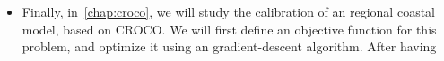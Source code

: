 \documentclass[../../Main_ManuscritThese.tex]{subfiles}
\begin{document}
\begin{itemize}
\item Finally, in~\cref{chap:croco}, we will study the calibration of
  an regional coastal model, based on CROCO\@. We will first define an
  objective function for this problem, and optimize it using an
  gradient-descent algorithm. After having 
\end{itemize}


\etoile


 
  
\end{document}

